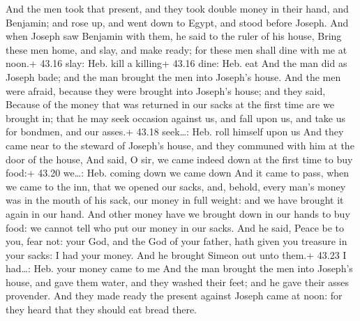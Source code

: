  And the men took that present, and they took double
money in their hand, and Benjamin; and rose up, and went down to Egypt,
and stood before Joseph.  And when Joseph saw Benjamin with
them, he said to the ruler of his house, Bring these men home, and slay,
and make ready; for these men shall dine with me at noon.+ 43.16 slay:
Heb. kill a killing+ 43.16 dine: Heb. eat  And the man did
as Joseph bade; and the man brought the men into Joseph's house.
 And the men were afraid, because they were brought into
Joseph's house; and they said, Because of the money that was returned in
our sacks at the first time are we brought in; that he may seek occasion
against us, and fall upon us, and take us for bondmen, and our asses.+
43.18 seek\ldots: Heb. roll himself upon us  And they came
near to the steward of Joseph's house, and they communed with him at the
door of the house,  And said, O sir, we came indeed down at
the first time to buy food:+ 43.20 we\ldots: Heb. coming down we came
down  And it came to pass, when we came to the inn, that we
opened our sacks, and, behold, every man's money was in the mouth of his
sack, our money in full weight: and we have brought it again in our
hand.  And other money have we brought down in our hands to
buy food: we cannot tell who put our money in our sacks. 
And he said, Peace be to you, fear not: your God, and the God of your
father, hath given you treasure in your sacks: I had your money. And he
brought Simeon out unto them.+ 43.23 I had\ldots: Heb. your money came
to me  And the man brought the men into Joseph's house, and
gave them water, and they washed their feet; and he gave their asses
provender.  And they made ready the present against Joseph
came at noon: for they heard that they should eat bread there.


